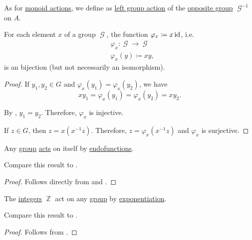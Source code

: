 \begin{definition}\label{def:right_group_action}
  As for \hyperref[def:right_monoid_action]{monoid actions}, we define  as \hyperref[def:left_group_action]{left group action} of the \hyperref[def:magma/opposite]{opposite group} \( \mscrG^{-1} \) on \( A \).
\end{definition}

\begin{lemma}\label{thm:group_multiplication_is_bijection}
  For each element \( x \) of a group \( \mscrG \), the function \( \varphi_x \coloneqq x\operatorname{id} \), i.e.
  \begin{align*}
    &\varphi_x: \mscrG \to \mscrG \\
    &\varphi_x(y) \coloneqq xy,
  \end{align*}
  is an bijection (but not necessarily an isomorphism).
\end{lemma}
\begin{proof}
   If \( y_1, y_2 \in G \) and \( \varphi_x(y_1) = \varphi_x(y_2) \), we have
  \begin{equation*}
    xy_1 = \varphi_x(y_1) = \varphi_x(y_2) = xy_2.
  \end{equation*}

  By , \( y_1 = y_2 \). Therefore, \( \varphi_x \) is injective.

   If \( z \in G \), then \( z = x(x^{-1} z) \). Therefore, \( z = \varphi_x(x^{-1} z) \) and \( \varphi_x \) is surjective.
\end{proof}

\begin{theorem}\label{thm:cayleys_theorem}
  Any \hyperref[def:group]{group} \hyperref[def:left_group_action]{acts} on itself by \hyperref[def:multi_valued_function/endofunction]{endofunctions}.

  Compare this result to .
\end{theorem}
\begin{proof}
  Follows directly from  and .
\end{proof}

\begin{proposition}\label{thm:integers_group_action}
  The \hyperref[def:set_of_integers]{integers} \( \BbbZ \) act on any \hyperref[def:group]{group} by \hyperref[def:group/exponentiation]{exponentiation}.

  Compare this result to .
\end{proposition}
\begin{proof}
  Follows from .
\end{proof}

